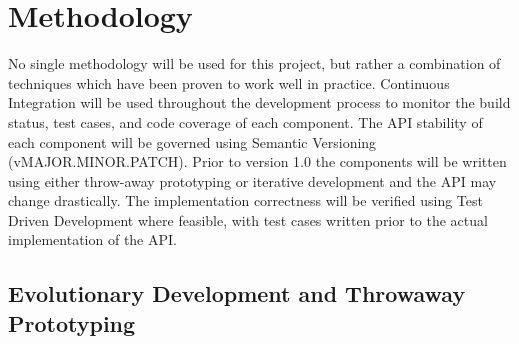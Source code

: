 
\section{Methodology}



No single methodology will be used for this project, but rather a combination of techniques which have been proven to work well in practice. Continuous Integration will be used throughout the development process to monitor the build status, test cases, and code coverage of each component. The API stability of each component will be governed using Semantic Versioning (vMAJOR.MINOR.PATCH). Prior to version 1.0 the components will be written using either throw-away prototyping or iterative development and the API may change drastically. The implementation correctness will be verified using Test Driven Development where feasible, with test cases written prior to the actual implementation of the API.





\subsection{Evolutionary Development and Throwaway Prototyping}

